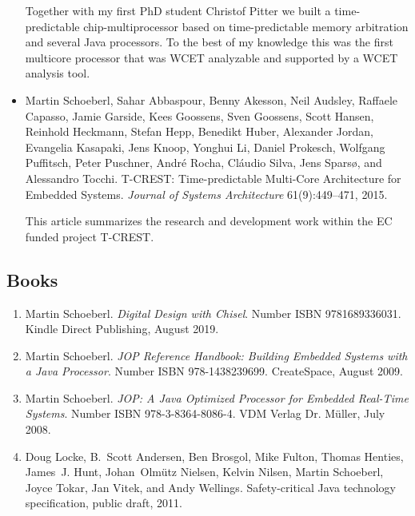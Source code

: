 \documentclass[%
    a4paper,
    11pt, %
    headinclude, footexclude,
    notitlepage,
    headsepline,
    pointlessnumbers,
    ]{scrartcl}
\begin{document}
\begin{itemize}
Together with my first PhD student Christof Pitter we built a time-predictable
chip-multiprocessor based on time-predictable memory arbitration and
several Java processors. To the best of my knowledge this was the first multicore
processor that was WCET analyzable and supported by a WCET analysis
tool.

\item Martin Schoeberl, Sahar Abbaspour, Benny Akesson, Neil Audsley, Raffaele Capasso, Jamie Garside, Kees Goossens, Sven Goossens, Scott Hansen, Reinhold Heckmann, Stefan Hepp, Benedikt Huber, Alexander Jordan, Evangelia Kasapaki, Jens Knoop, Yonghui Li, Daniel Prokesch, Wolfgang Puffitsch, Peter Puschner, Andr\'{e} Rocha, Cl\'{a}udio Silva, Jens Spars{\o}, and Alessandro Tocchi.
 T-CREST: Time-predictable Multi-Core Architecture for Embedded Systems.
 \emph{Journal of Systems Architecture} 61(9):449--471, 2015.
 
 
This article summarizes the research and development work within the EC funded
project T-CREST.
 
\end{itemize}

\subsection*{Books}

\begin{enumerate}

\item Martin Schoeberl. {\em Digital Design with Chisel}.
Number ISBN 9781689336031. Kindle Direct Publishing, August 2019. 

\item Martin Schoeberl. {\em JOP Reference Handbook: Building
    Embedded Systems with a Java Processor}. Number ISBN
978-1438239699. CreateSpace, August 2009.

\item Martin Schoeberl. {\em JOP: A Java Optimized Processor for
    Embedded Real-Time Systems}. Number ISBN 978-3-8364-8086-4.
    VDM Verlag Dr. M{\"u}ller, July 2008.

\item Doug Locke, B.~Scott Andersen, Ben Brosgol, Mike Fulton, Thomas Henties,
  James~J. Hunt, Johan~Olm\"{u}tz Nielsen, Kelvin Nilsen, Martin Schoeberl,
  Joyce Tokar, Jan Vitek, and Andy Wellings.
 Safety-critical {Java} technology specification, public draft, 2011.

\end{enumerate}
\end{document}

